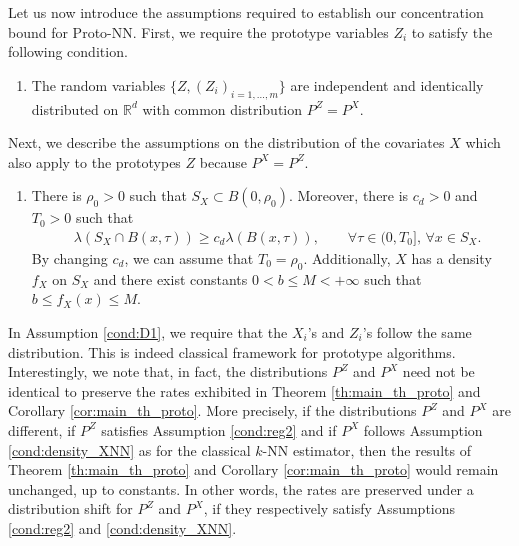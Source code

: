 \documentclass[paper=a4, fontsize=11pt]{scrartcl}
\begin{document}
Let us now introduce the assumptions required to establish our concentration bound for Proto-NN. First, we require the prototype variables $Z_i$ to satisfy the following condition.

\begin{enumerate}[label=(DZ), wide=0.5em,  leftmargin=*]
\item \label{cond:D1} 
The random variables $\{Z, (Z_i)_ {i=1,\ldots,m} \}$ are independent and identically distributed on $\mathbb R^d$ with common distribution $  P^Z  = P^X$. 
\end{enumerate}


Next, we describe the assumptions on the distribution of the covariates $X$ which also apply to the prototypes $Z$ because $P^X = P^Z$.


\begin{enumerate}[label=(XZ), wide=0.5em,  leftmargin=*]
\item \label{cond:reg2} There is $\rho_0 > 0$ such that $S_X\subset B (0, \rho_0)$. Moreover, there is $c_d>0$ and $T_0>0$ such that
\begin{align*}
&\lambda (S_X \cap  B(x, \tau ) ) \geq c_d \lambda   ( B(x, \tau )) , \qquad \forall \tau \in (0,T_0] , \, \forall x\in S_X.
\end{align*}
 By changing \( c_d \), we can assume that \( T_0 = \rho_0\). Additionally, $X$ has a density $f_X$ on $S_X$  and there exist constants $0 < b\leq M <+\infty$ such that $ b \leq f_X (x) \leq M$. 
\end{enumerate}

In Assumption \ref{cond:D1}, we require that the $X_i$'s and $Z_i$'s follow the same distribution. This is indeed classical framework for prototype algorithms. Interestingly, we note that, in fact, the distributions $P^Z$ and $ P^X$ need not be identical to preserve the rates exhibited in Theorem \ref{th:main_th_proto} and Corollary \ref{cor:main_th_proto}. More precisely, if the distributions $P^Z$ and $P^X$ are different, if $P^Z$ satisfies Assumption \ref{cond:reg2} and if $P^X$ follows Assumption \ref{cond:density_XNN} as for the classical $k$-NN estimator, then the results of Theorem \ref{th:main_th_proto} and Corollary \ref{cor:main_th_proto} would remain unchanged, up to constants. In other words, the rates are preserved under a distribution shift for $P^Z$ and $P^X$, if they respectively satisfy Assumptions \ref{cond:reg2} and \ref{cond:density_XNN}. 
\end{document}
